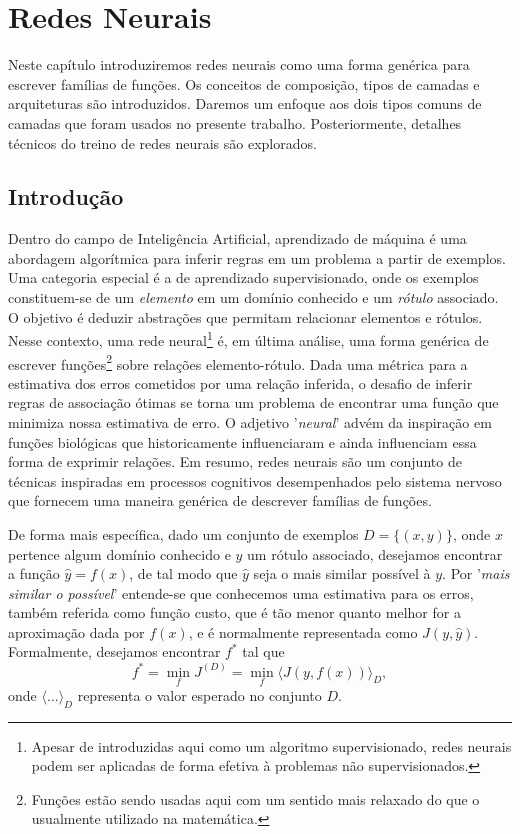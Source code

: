 \chapter{Redes Neurais} \label{cap:neurais}

Neste capítulo introduziremos redes neurais como uma forma genérica para escrever famílias de funções. Os conceitos de composição, tipos de camadas e arquiteturas são introduzidos. Daremos um enfoque aos dois tipos comuns de camadas que foram usados no presente trabalho. Posteriormente, detalhes técnicos do treino de redes neurais são explorados. 

\section{Introdução}

Dentro do campo de Inteligência Artificial, aprendizado de máquina é uma abordagem algorítmica para inferir regras em um problema a partir de exemplos. Uma categoria especial é a de aprendizado supervisionado, onde os exemplos constituem-se de um \textit{elemento} em um domínio conhecido e um \textit{rótulo} associado. O objetivo é deduzir abstrações que permitam relacionar elementos e rótulos. Nesse contexto, uma rede neural\footnote{Apesar de introduzidas aqui como um algoritmo supervisionado, redes neurais podem ser aplicadas de forma efetiva à problemas não supervisionados.} é, em última análise, uma forma genérica de escrever funções\footnote{Funções estão sendo usadas aqui com um sentido mais relaxado do que o usualmente utilizado na matemática.} sobre relações elemento-rótulo. Dada uma métrica para a estimativa dos erros cometidos por uma relação inferida, o desafio de inferir regras de associação ótimas se torna um problema de encontrar uma função que minimiza nossa estimativa de erro. O adjetivo '\textit{neural}' advém da inspiração em funções biológicas que historicamente influenciaram e ainda influenciam essa forma de exprimir relações. Em resumo, redes neurais são um conjunto de técnicas inspiradas em processos cognitivos desempenhados pelo sistema nervoso que fornecem uma maneira genérica de descrever famílias de funções.

De forma mais específica, dado um conjunto de exemplos $D = \{(x, y)\}$, onde $x$  pertence algum domínio conhecido e $y$ um rótulo associado, desejamos encontrar a função $\hat{y} = f(x)$, de tal modo que $\hat{y}$ seja o mais similar possível à $y$. Por '\textit{mais similar o possível}' entende-se que conhecemos uma estimativa para os erros, também referida como função custo, que é tão menor quanto melhor for a aproximação dada por $f(x)$, e é normalmente representada como $J(y, \hat{y})$. Formalmente, desejamos encontrar $f^*$ tal que
\begin{equation}
f^* = \min_f J^{(D)} = \min_f \langle J(y, f(x)) \rangle_{D},
\end{equation}   
onde $\langle \ldots \rangle_{D}$ representa o valor esperado no conjunto $D$.

